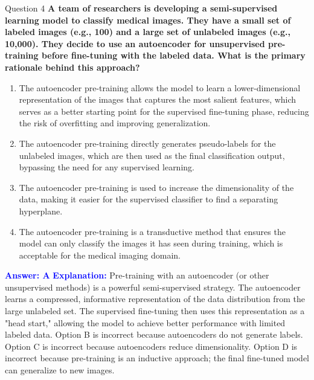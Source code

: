 \documentclass{beamer}
\begin{document}
	\begin{frame}{Question 4}
		\textbf{A team of researchers is developing a semi-supervised learning model to classify medical images. They have a small set of labeled images (e.g., 100) and a large set of unlabeled images (e.g., 10,000). They decide to use an autoencoder for unsupervised pre-training before fine-tuning with the labeled data. What is the primary rationale behind this approach?}
		\begin{enumerate}
			\item The autoencoder pre-training allows the model to learn a lower-dimensional representation of the images that captures the most salient features, which serves as a better starting point for the supervised fine-tuning phase, reducing the risk of overfitting and improving generalization.
			\item The autoencoder pre-training directly generates pseudo-labels for the unlabeled images, which are then used as the final classification output, bypassing the need for any supervised learning.
			\item The autoencoder pre-training is used to increase the dimensionality of the data, making it easier for the supervised classifier to find a separating hyperplane.
			\item The autoencoder pre-training is a transductive method that ensures the model can only classify the images it has seen during training, which is acceptable for the medical imaging domain.
		\end{enumerate}
		\vspace{0.2cm}
		\textcolor{blue}{\textbf{Answer: A}}
		\vspace{0.2cm}
		\textcolor{blue}{\textbf{Explanation:}} Pre-training with an autoencoder (or other unsupervised methods) is a powerful semi-supervised strategy. The autoencoder learns a compressed, informative representation of the data distribution from the large unlabeled set. The supervised fine-tuning then uses this representation as a "head start," allowing the model to achieve better performance with limited labeled data. Option B is incorrect because autoencoders do not generate labels. Option C is incorrect because autoencoders reduce dimensionality. Option D is incorrect because pre-training is an inductive approach; the final fine-tuned model can generalize to new images.
	\end{frame}
	
\end{document}
